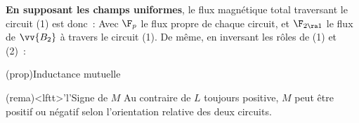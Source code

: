 \documentclass[../../main/main.tex]{subfiles}
\begin{document}
\textbf{En supposant les champs uniformes}, le flux magnétique total traversant
le circuit (1) est donc~:
%
Avec $\F_p$ le flux propre de chaque circuit, et $\F_{2\ra 1}$ le flux de
$\vv{B_2}$ à travers le circuit (1). De même, en inversant les rôles de (1) et
(2)~:
\psw{%
	\[
		\F_2 = \F_{p,2} + \F_{1\ra 2}
	\]
}%

\begin{tcb*}(prop){Inductance mutuelle}
\end{tcb*}

\begin{tcb}(rema)<lftt>'l'{Signe de $M$}
	Au contraire de $L$ toujours positive, $M$ peut être positif ou négatif selon
	l'orientation relative des deux circuits.
\end{tcb}
\end{document}
